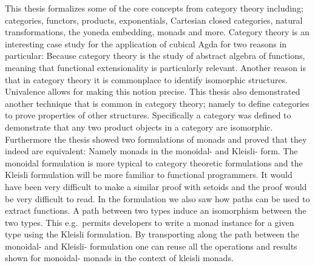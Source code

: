 This thesis formalizes some of the core concepts from category theory
including; categories, functors, products, exponentials, Cartesian
closed categories, natural transformations, the yoneda embedding,
monads and more.  Category theory is an interesting case study for the
application of cubical Agda for two reasons in particular: Because
category theory is the study of abstract algebra of functions, meaning
that functional extensionality is particularly relevant.  Another
reason is that in category theory it is commonplace to identify
isomorphic structures.  Univalence allows for making this notion
precise.  This thesis also demonstrated another technique that is
common in category theory; namely to define categories to prove
properties of other structures.  Specifically a category was defined
to demonstrate that any two product objects in a category are
isomorphic.  Furthermore the thesis showed two formulations of monads
and proved that they indeed are equivalent: Namely monads in the
monoidal- and Kleisli- form.  The monoidal formulation is more typical
to category theoretic formulations and the Kleisli formulation will be
more familiar to functional programmers.  It would have been very
difficult to make a similar proof with setoids and the proof would be
very difficult to read.  In the formulation we also saw how paths can
be used to extract functions.  A path between two types induce an
isomorphism between the two types.  This e.g.\ permits developers to
write a monad instance for a given type using the Kleisli formulation.
By transporting along the path between the monoidal- and Kleisli-
formulation one can reuse all the operations and results shown for
monoidal- monads in the context of kleisli monads.
